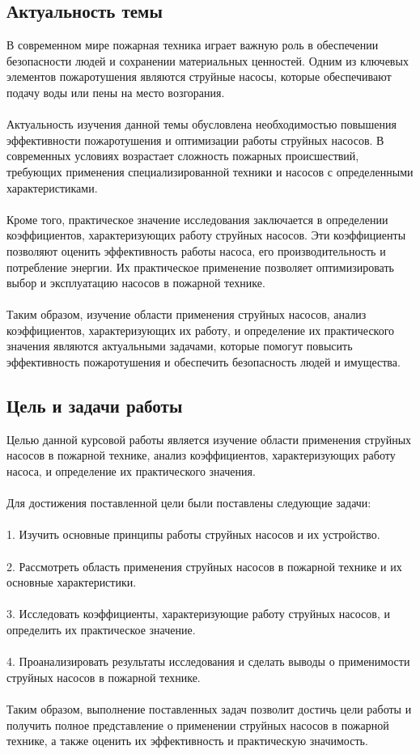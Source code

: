 \documentclass{article}
\begin{document}
\subsection{Актуальность темы}
В современном мире пожарная техника играет важную роль в обеспечении безопасности людей и сохранении материальных ценностей. Одним из ключевых элементов пожаротушения являются струйные насосы, которые обеспечивают подачу воды или пены на место возгорания.\\
~\\
Актуальность изучения данной темы обусловлена необходимостью повышения эффективности пожаротушения и оптимизации работы струйных насосов. В современных условиях возрастает сложность пожарных происшествий, требующих применения специализированной техники и насосов с определенными характеристиками.\\
~\\
Кроме того, практическое значение исследования заключается в определении коэффициентов, характеризующих работу струйных насосов. Эти коэффициенты позволяют оценить эффективность работы насоса, его производительность и потребление энергии. Их практическое применение позволяет оптимизировать выбор и эксплуатацию насосов в пожарной технике.\\
~\\
Таким образом, изучение области применения струйных насосов, анализ коэффициентов, характеризующих их работу, и определение их практического значения являются актуальными задачами, которые помогут повысить эффективность пожаротушения и обеспечить безопасность людей и имущества.
\subsection{Цель и задачи работы}
Целью данной курсовой работы является изучение области применения струйных насосов в пожарной технике, анализ коэффициентов, характеризующих работу насоса, и определение их практического значения.\\
~\\
Для достижения поставленной цели были поставлены следующие задачи:\\
~\\
1. Изучить основные принципы работы струйных насосов и их устройство.\\
~\\
2. Рассмотреть область применения струйных насосов в пожарной технике и их основные характеристики.\\
~\\
3. Исследовать коэффициенты, характеризующие работу струйных насосов, и определить их практическое значение.\\
~\\
4. Проанализировать результаты исследования и сделать выводы о применимости струйных насосов в пожарной технике.\\
~\\
Таким образом, выполнение поставленных задач позволит достичь цели работы и получить полное представление о применении струйных насосов в пожарной технике, а также оценить их эффективность и практическую значимость.
\end{document}
